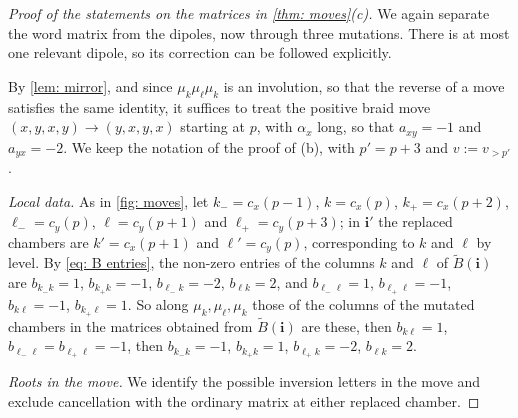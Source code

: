 \documentclass[a4paper]{amsart}
\numberwithin{equation}{section}
\theoremstyle{definition}
\theoremstyle{remark}
\newcommand{\bfi}{\mathbf{i}}
\newcommand{\tB}{\widetilde{B}}
\begin{document}
\begin{proof}[Proof of the statements on the matrices in \cref{thm: moves}(c)]
We again separate the word matrix from the dipoles, now through three mutations.
There is at most one relevant dipole, so its correction can be followed explicitly.

  By \cref{lem: mirror}, and since $\mu_k\mu_\ell\mu_k$ is an involution, so that the reverse of a move satisfies the same identity, it suffices to treat the positive braid move $(x,y,x,y)\to(y,x,y,x)$ starting at $p$, with $\alpha_x$ long, so that $a_{xy}=-1$ and $a_{yx}=-2$.
  We keep the notation of the proof of (b), with $p'=p+3$ and $v:=v_{>p'}$.

  \emph{Local data.}
  As in \cref{fig: moves}, let $k_-=c_x(p-1)$, $k=c_x(p)$, $k_+=c_x(p+2)$, $\ell_-=c_y(p)$, $\ell=c_y(p+1)$ and $\ell_+=c_y(p+3)$; in $\bfi'$ the replaced chambers are $k'=c_x(p+1)$ and $\ell'=c_y(p)$, corresponding to $k$ and $\ell$ by level.
  By \eqref{eq: B entries}, the non-zero entries of the columns $k$ and $\ell$ of $\tB(\bfi)$ are $b_{k_-k}=1$, $b_{k_+k}=-1$, $b_{\ell_-k}=-2$, $b_{\ell k}=2$, and $b_{\ell_-\ell}=1$, $b_{\ell_+\ell}=-1$, $b_{k\ell}=-1$, $b_{k_+\ell}=1$.
  So along $\mu_k,\mu_\ell,\mu_k$ those of the columns of the mutated chambers in the matrices obtained from $\tB(\bfi)$ are these, then $b_{k\ell}=1$, $b_{\ell_-\ell}=b_{\ell_+\ell}=-1$, then $b_{k_-k}=-1$, $b_{k_+k}=1$, $b_{\ell_+k}=-2$, $b_{\ell k}=2$.

  \emph{Roots in the move.}
We identify the possible inversion letters in the move and exclude cancellation with the ordinary matrix at either replaced chamber.


\end{proof}
\end{document}
